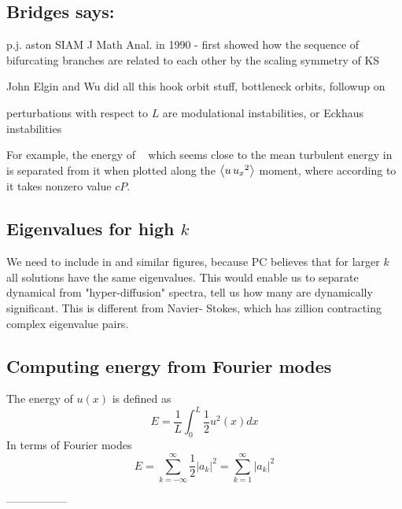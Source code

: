 \subsection{Bridges says:}

p.j. aston SIAM J Math Anal. in 1990 - first showed how the sequence of bifurcating branches
are related to each other by the scaling symmetry of KS

John Elgin and Wu did all this hook orbit stuff, bottleneck orbits, followup on

perturbations with respect to $L$ are modulational instabilities, or Eckhaus  instabilities

For example, the energy of \reqva\  which
seems close to the
mean turbulent energy in  is separated
from it when plotted along the
$\left\langle {u \, u_{x}{}^2} \right\rangle$ moment, where according to
 it takes nonzero value $c P$.

\subsection{Eigenvalues for high $k$}

We need to include  
in  and similar figures, because
PC believes that for larger $k$ all solutions have the same eigenvalues. This
    would enable us to separate dynamical from "hyper-diffusion" spectra,
    tell us how many are dynamically significant. This is different from Navier-
Stokes,
    which has zillion contracting complex eigenvalue pairs.

\subsection{Computing energy from Fourier modes}
The energy of $u(x)$ is defined as
\[
   E = \frac{1}{L}\int_0^L \textstyle\frac{1}{2}u^2(x) dx
\]
In terms of Fourier modes
\[
   E = \sum_{k=-\infty}^\infty {\textstyle\frac{1}{2}}|a_k|^2 =
   \sum_{k=1}^\infty |a_k|^2
\]

-----------------


